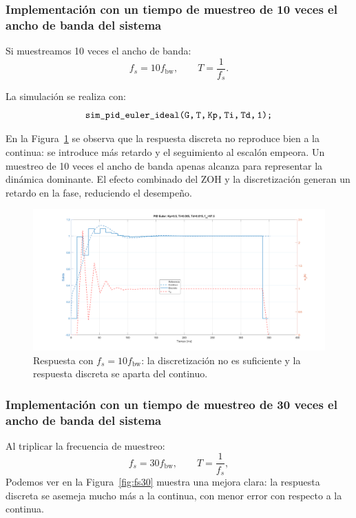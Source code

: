\twocolumn
\subsubsection{ Implementación con un tiempo de muestreo de 10 veces el ancho de banda del sistema
}


Si muestreamos 10 veces el ancho de banda:
\[
f_s = 10 f_{\mathrm{bw}}, \qquad T = \frac{1}{f_s}.
\]

La simulación se realiza con:
\[
\texttt{sim\_pid\_euler\_ideal(G,\,T,\,Kp,\,Ti,\,Td,\,1);}
\]

En la Figura~\ref{fig:fs10} se observa que la respuesta discreta no reproduce bien a la continua: se introduce más retardo y el seguimiento al escalón empeora.
Un muestreo de 10 veces el ancho de banda apenas alcanza para representar la dinámica dominante. El efecto combinado del ZOH y la discretización generan un retardo en la fase, reduciendo el desempeño.  

\begin{figure}[!t]
	\centering
	\includegraphics[width=\columnwidth]{img/fs10.png}
	\caption{Respuesta con $f_s=10 f_{\mathrm{bw}}$: la discretización no es suficiente y la respuesta discreta se aparta del continuo.}
	\label{fig:fs10}
\end{figure}



\subsubsection{ Implementación con un tiempo de muestreo de 30 veces el ancho de banda del sistema
}

Al triplicar la frecuencia de muestreo:
\[
f_s = 30 f_{\mathrm{bw}}, \qquad T = \frac{1}{f_s},
\]
Podemos ver en la Figura~\ref{fig:fs30} muestra una mejora clara: la respuesta discreta se asemeja mucho más a la continua, con menor error con respecto a la continua.

